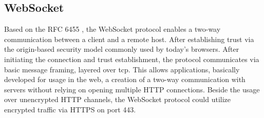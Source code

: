 \subsection{WebSocket}
\label{ch:Fundamentals:sec:Data Exchange:ssec:WebSocket}

Based on the RFC 6455 \cite{melnikov_websocket_2011}, the WebSocket protocol enables a two-way communication between a client and a remote host. After establishing trust via the origin-based security model commonly used by today's browsers. After initiating the connection and trust establishment, the protocol communicates via basic message framing, layered over \acrshort{tcp}.
This allows applications, basically developed for usage in the web, a creation of a two-way communication with servers without relying on opening multiple HTTP connections.
Beside the usage over unencrypted HTTP channels, the WebSocket protocol could utilize encrypted traffic via HTTPS on port 443.
